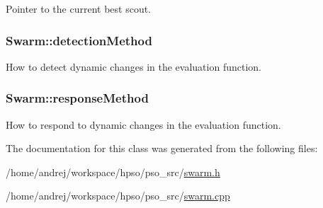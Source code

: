 Pointer to the current best scout. 

\hypertarget{classSwarm_fccbdf32a0ea11cb33665d64ffb15c56}{
\subsubsection{ {\bf Swarm::detectionMethod}}}
\label{classSwarm_fccbdf32a0ea11cb33665d64ffb15c56}


How to detect dynamic changes in the evaluation function. 

\hypertarget{classSwarm_f051986abd458ad38f3905d8f190bdc8}{
\subsubsection{ {\bf Swarm::responseMethod}}}
\label{classSwarm_f051986abd458ad38f3905d8f190bdc8}


How to respond to dynamic changes in the evaluation function. 



The documentation for this class was generated from the following files:\begin{CompactItemize}
\item 
/home/andrej/workspace/hpso/pso\_\-src/\hyperlink{swarm_8h}{swarm.h}\item 
/home/andrej/workspace/hpso/pso\_\-src/\hyperlink{swarm_8cpp}{swarm.cpp}\end{CompactItemize}
